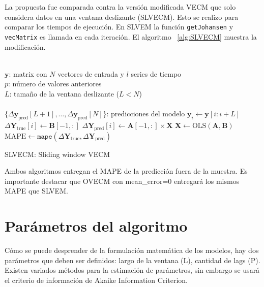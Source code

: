 La propuesta fue comparada contra la versión modificada VECM que solo considera
datos en una ventana deslizante (SLVECM). Esto se realizo para comparar los
tiempos de ejecución. En SLVEM la función \texttt{getJohansen} y
\texttt{vecMatrix} es llamada en cada iteración. El algoritmo ~\ref{alg:SLVECM}
muestra la modificación.

\begin{algorithm}[ht]
\begin{algorithmic}[1]
\REQUIRE $\,$ \\
$\mathbf{y}$: matrix con $N$ vectores de entrada y $l$ series de tiempo\\
$p$: número de valores anteriores\\
$L$: tamaño de la ventana deslizante ($L<N$) \\
\ENSURE  $\,$ \\
$\{\Delta \mathbf{y}_{\text{pred}}[L+1],\dots,\Delta \mathbf{y}_{\text{pred}}[N]\}$: predicciones del modelo
    \STATE $\mathbf{y}_i \gets \mathbf{y}[i:i+L]$
        \STATE $\Delta \mathbf{Y}_{\text{true}}[i] \gets \mathbf{B}[-1,:]$
        \STATE $\Delta \mathbf{Y}_{\text{pred}}[i] \gets \mathbf{A}[-1,:] \times \mathbf{X}$
    \ENDIF
    \STATE $\mathbf{X} \gets \text{OLS} (\mathbf{A},\mathbf{B})$
\ENDFOR
    \STATE $\text{MAPE} \gets \texttt{mape}(\Delta \mathbf{Y}_{\text{true}}, \Delta
    \mathbf{Y}_{\text{pred}})$
\end{algorithmic}
\caption{SLVECM: Sliding window VECM}
\label{alg:SLVECM}
\end{algorithm}

Ambos algoritmos entregan el MAPE de la predicción fuera de la muestra. Es
importante destacar que OVECM con mean\_error=0 entregará los mismos MAPE que
SLVEM.

\section{Parámetros del algoritmo}
Cómo se puede desprender de la formulación matemática de los modelos, hay dos
parámetros que deben ser definidos: largo de la ventana (L), cantidad de lags
(P). Existen variados métodos para la estimación de parámetros, sin embargo se
usará el criterio de información de Akaike Information Criterion.


